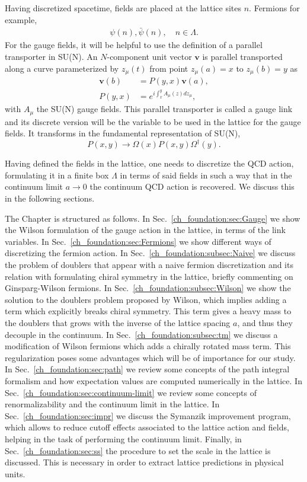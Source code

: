 Having discretized spacetime, fields are placed at the lattice sites $n$. Fermions for example,
\begin{gather}
\psi(n),\bar{\psi}(n), \quad
n\in\Lambda.
\end{gather}
For the gauge fields, it will be helpful to use the definition of a parallel transporter in SU(N). An $N$-component unit vector $\boldsymbol{v}$ is parallel transported along a curve parameterized by $z_{\mu}(t)$ from point $z_{\mu}(a)=x$ to $z_{\mu}(b)=y$ as
\begin{align}
\boldsymbol{v}(b)&=P(y,x)\boldsymbol{v}(a),\\
P(y,x)&=e^{i\int_x^yA_{\mu}(z)dz_{\mu}},
\end{align}
with $A_{\mu}$ the SU(N) gauge fields. This parallel transporter is called a gauge link and its discrete version will be the variable to be used in the lattice for the gauge fields. It transforms in the fundamental representation of SU(N),
\begin{equation}
P(x,y)\to\Omega(x)P(x,y)\Omega^{\dagger}(y).
\end{equation}

Having defined the fields in the lattice, one needs to discretize the QCD action, formulating it in a finite box $\Lambda$ in terms of said fields in such a way that in the continuum limit $a\rightarrow 0$ the continuum QCD action is recovered. We discuss this in the following sections.	

The Chapter is structured as follows. In Sec.~\ref{ch_foundation:sec:Gauge} we show the Wilson formulation of the gauge action in the lattice, in terms of the link variables. In Sec.~\ref{ch_foundation:sec:Fermions} we show different ways of discretizing the fermion action. In Sec.~\ref{ch_foundation:subsec:Naive} we discuss the problem of doublers that appear with a naive fermion discretization and its relation with formulating chiral symmetry in the lattice, briefly commenting on Ginsparg-Wilson fermions. In Sec.~\ref{ch_foundation:subsec:Wilson} we show the solution to the doublers problem proposed by Wilson, which implies adding a term which explicitly breaks chiral symmetry. This term gives a heavy mass to the doublers that grows with the inverse of the lattice spacing $a$, and thus they decouple in the continuum. In Sec.~\ref{ch_foundation:subsec:tm} we discuss a modification of Wilson fermions which adds a chirally rotated mass term. This regularization poses some advantages which will be of importance for our study. In Sec.~\ref{ch_foundation:sec:path} we review some concepts of the path integral formalism and how expectation values are computed numerically in the lattice. In Sec.~\ref{ch_foundation:sec:continuum-limit} we review some concepts of renormalizability and the continuum limit in the lattice. In Sec.~\ref{ch_foundation:sec:impr} we discuss the Symanzik improvement program, which allows to reduce cutoff effects associated to the lattice action and fields, helping in the task of performing the continuum limit. Finally, in Sec.~\ref{ch_foundation:sec:ss} the procedure to set the scale in the lattice is discussed. This is necessary in order to extract lattice predictions in physical units.

